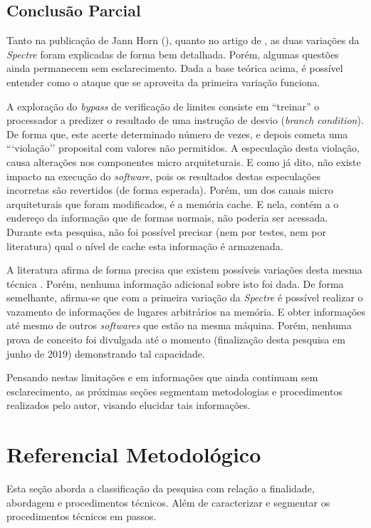 \documentclass[
	article,			    %
	12pt,				    %
	oneside,			    %
	a4paper,			    %
	chapter=TITLE,		    %
	section=TITLE,		    %
	subsection=TITLE,	    %
	english,			    %
	brazil,				    %
	sumario=tradicional
]{abntex2}
\begin{document}
\subsection{Conclusão Parcial}
Tanto na publicação de Jann Horn (\citeyear{Jann2018Reading}), quanto no artigo de , as duas variações da \emph{Spectre} foram explicadas de forma bem detalhada. Porém, algumas questões ainda permanecem sem esclarecimento. Dada a base teórica acima, é possível entender como o ataque que se aproveita da primeira variação funciona.

A exploração do \emph{bypass} de verificação de limites consiste em “treinar” o processador a predizer o resultado de uma instrução de desvio (\emph{branch condition}). De forma que, este acerte determinado número de vezes, e depois cometa uma ```violação'' proposital com valores não permitidos. A especulação desta violação, causa alterações nos componentes micro arquiteturais. E como já dito, não existe impacto na execução do \emph{software}, pois os resultados destas especulações incorretas são revertidos (de forma esperada). Porém, um dos canais micro arquiteturais que foram modificados, é a memória cache. E nela, contém a o endereço da informação que de formas normais, não poderia ser acessada. Durante esta pesquisa, não foi possível precisar (nem por testes, nem por literatura) qual o nível de cache esta informação é armazenada.

A literatura afirma de forma precisa que existem possíveis variações desta mesma técnica \cite{Kocher2018Spectre}. Porém, nenhuma informação adicional sobre isto foi dada. De forma semelhante, afirma-se que com a primeira variação da \emph{Spectre} é possível realizar o vazamento de informações de lugares arbitrários na memória. E obter informações até mesmo de outros \emph{softwares} que estão na mesma máquina. Porém, nenhuma prova de conceito foi divulgada até o momento (finalização desta pesquisa em junho de 2019) demonstrando tal capacidade.

Pensando nestas limitações e em informações que ainda continuam sem esclarecimento, as próximas seções segmentam metodologias e procedimentos realizados pelo autor, visando elucidar tais informações.

\section{Referencial Metodológico}
Esta seção aborda a classificação da pesquisa com relação a finalidade, abordagem e procedimentos técnicos. Além de caracterizar e segmentar os procedimentos técnicos em passos.
\end{document}
